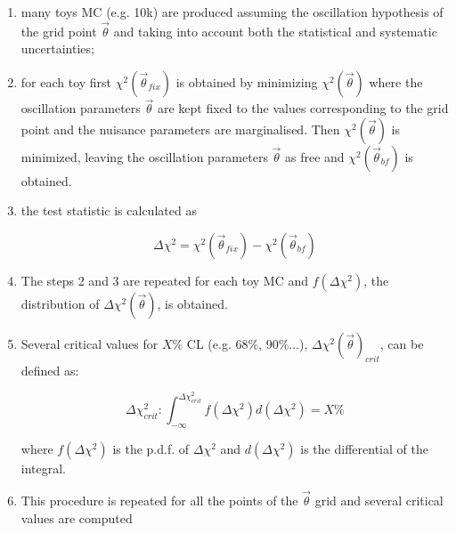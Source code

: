 \begin{enumerate}

\item many toys MC (e.g. 10k) are produced 
	assuming the oscillation hypothesis of the grid point $\vec{\theta}$
 	and taking into account both the statistical and systematic uncertainties; 

\item for each toy first $\chi^2(\vec{\theta}_{fix})$ is obtained
	by minimizing $\chi^2 (\vec{\theta})$
	where the oscillation parameters $\vec{\theta}$ are kept 
	fixed to the values corresponding to the grid point  
	and the nuisance parameters are marginalised.
	Then $\chi^2 (\vec{\theta})$ is minimized, 
	leaving the oscillation parameters $\vec{\theta}$ as free and
	$\chi^2 (\vec{\theta}_{bf})$ is obtained. 
	
\item the test statistic is calculated as

	\begin{equation}
	\Delta \chi^2 = \chi^2(\vec{\theta}_{fix}) - \chi^2 (\vec{\theta}_{bf})
	\end{equation}
	

\item The steps 2 and 3 are repeated for each toy MC 
	and $f(\Delta \chi^2)$, the distribution of $\Delta \chi^2 (\vec{\theta})$,
	is obtained.

\item Several critical values for $X\%$ CL (e.g. 68\%, 90\%...),
 	$\Delta \chi^2 (\vec{\theta})_{crit}$,
	can be defined as:
	
	\begin{equation} \label{eq:def_crit_val}
	\Delta \chi^2_{crit}: \int_{-\infty}^{\Delta \chi^2_{crit}} f(\Delta \chi^2) d( \Delta \chi^2) = X\%
	\end{equation}		
	
	where $f(\Delta \chi^2)$ is the p.d.f. of $\Delta \chi^2$ and 
	$d( \Delta \chi^2)$ is the differential of the integral.
	
\item This procedure is repeated for all the points of the $\vec{\theta}$ grid
	and several critical values are computed
	
\end{enumerate}

